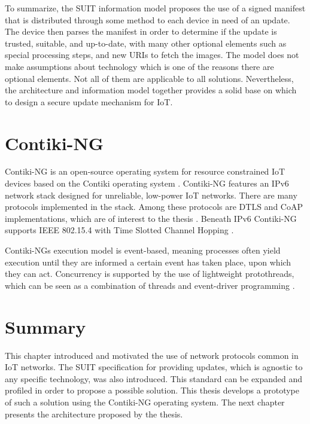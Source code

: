 \documentclass[0-thesis.tex]{subfiles}
\begin{document}
To summarize, the SUIT information model proposes the use of a signed manifest that is
distributed through some method to each device in need of an update. The device then
parses the manifest in order to determine if the update is trusted, suitable, and
up-to-date, with many other optional elements such as special processing steps, and new
URIs to fetch the images. The model does not make assumptions about technology which is
one of the reasons there are optional elements. Not all of them are applicable to all
solutions. Nevertheless, the architecture and information model together provides a solid
base on which to design a secure update mechanism for IoT.

\section{Contiki-NG}
\label{sec:contiki-ng}
Contiki-NG is an open-source operating system for resource constrained IoT devices based
on the Contiki operating system \parencite{contiki-ng-github, contiki-github}. Contiki-NG
features an IPv6 network stack designed for unreliable, low-power IoT networks. There are
many protocols implemented in the stack. Among these protocols are DTLS and CoAP
implementations, which are of interest to the thesis \parencite{low-power-coap}. Beneath
IPv6 Contiki-NG supports IEEE 802.15.4 with Time Slotted Channel Hopping
\parencite{ieee-802.15.4}.

Contiki-NGs execution model is event-based, meaning processes often yield execution until
they are informed a certain event has taken place, upon which they can act. Concurrency is
supported by the use of lightweight protothreads, which can be seen as a combination of
threads and event-driver programming \parencite{protothreads}.

\section{Summary}
\label{sec:2-summary}
This chapter introduced and motivated the use of network protocols common in IoT networks.
The SUIT specification for providing updates, which is agnostic to any specific
technology, was also introduced. This standard can be expanded and profiled in order to
propose a possible solution. This thesis develops a prototype of such a solution using the
Contiki-NG operating system. The next chapter presents the architecture proposed by the
thesis.
\end{document}
